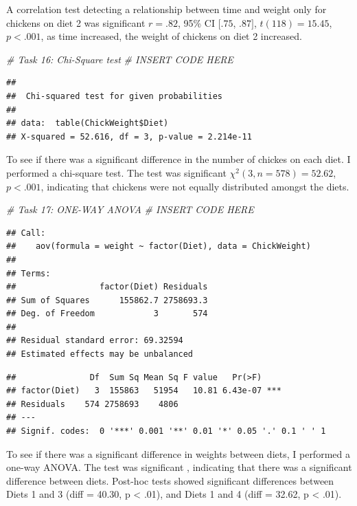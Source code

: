 \documentclass[english,man]{apa6}
\newenvironment{Shaded}{\begin{snugshade}}{\end{snugshade}}
\newcommand{\CommentTok}[1]{\textcolor[rgb]{0.56,0.35,0.01}{\textit{{#1}}}}
\begin{document}
A correlation test detecting a relationship between time and weight only
for chickens on diet 2 was significant \(r = .82\), 95\% CI \([.75\),
\(.87]\), \(t(118) = 15.45\), \(p < .001\), as time increased, the
weight of chickens on diet 2 increased.

\begin{Shaded}
\begin{Highlighting}[]
\CommentTok{# Task 16: Chi-Square test}
\CommentTok{# INSERT CODE HERE}
\end{Highlighting}
\end{Shaded}

\begin{verbatim}
## 
##  Chi-squared test for given probabilities
## 
## data:  table(ChickWeight$Diet)
## X-squared = 52.616, df = 3, p-value = 2.214e-11
\end{verbatim}

To see if there was a significant difference in the number of chickes on
each diet. I performed a chi-square test. The test was significant
\(\chi^2(3, n = 578) = 52.62\), \(p < .001\), indicating that chickens
were not equally distributed amongst the diets.

\begin{Shaded}
\begin{Highlighting}[]
\CommentTok{# Task 17: ONE-WAY ANOVA}
\CommentTok{# INSERT CODE HERE}
\end{Highlighting}
\end{Shaded}

\begin{verbatim}
## Call:
##    aov(formula = weight ~ factor(Diet), data = ChickWeight)
## 
## Terms:
##                 factor(Diet) Residuals
## Sum of Squares      155862.7 2758693.3
## Deg. of Freedom            3       574
## 
## Residual standard error: 69.32594
## Estimated effects may be unbalanced
\end{verbatim}

\begin{verbatim}
##               Df  Sum Sq Mean Sq F value   Pr(>F)    
## factor(Diet)   3  155863   51954   10.81 6.43e-07 ***
## Residuals    574 2758693    4806                     
## ---
## Signif. codes:  0 '***' 0.001 '**' 0.01 '*' 0.05 '.' 0.1 ' ' 1
\end{verbatim}

To see if there was a significant difference in weights between diets, I
performed a one-way ANOVA. The test was significant , indicating that
there was a significant difference between diets. Post-hoc tests showed
significant differences between Diets 1 and 3 (diff = 40.30, p
\textless{} .01), and Diets 1 and 4 (diff = 32.62, p \textless{} .01).
\end{document}
